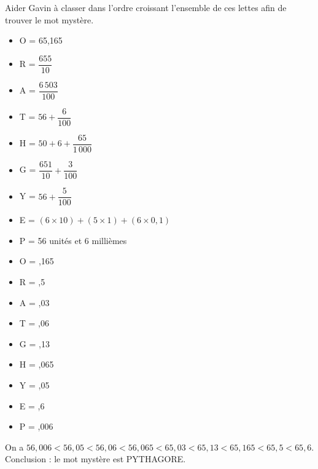 \begin{exercice} %
    Aider Gavin à classer dans l'ordre croissant l'ensemble de ces lettes afin de trouver le mot mystère. \smallskip
    \begin{itemize}
       \item O = 65,165 \medskip
       \item R = $\dfrac{655}{10}$ \medskip
       \item A = $\dfrac{6\,503}{100}$ \medskip
       \item T = $56+\dfrac{6}{100}$ \medskip
       \item H = $50+6+\dfrac{65}{1\,000}$ \medskip
       \item G = $\dfrac{651}{10}+\dfrac{3}{100}$ \medskip
       \item Y = $56+\dfrac{5}{100}$ \medskip
       \item E = $(6\times10)+(5\times1)+(6\times0,1)$ \smallskip
       \item P = 56 unités et 6 millièmes
    \end{itemize}

 \end{exercice}
 
 \begin{corrige}
    \begin{itemize}
       \item O = ,165
       \item R = ,5
       \item A = ,03
       \item T = ,06
       \item G = ,13
       \item H = ,065
       \item Y = ,05
       \item E = ,6
       \item P = ,006
    \end{itemize}
    On a {\blue $56,006 < 56,05 < 56,06 < 56,065 < 65,03 < 65,13 < 65,165 < 65,5 < 65,6$}. \\
    Conclusion : le mot mystère est \blue PYTHAGORE. \\
 \end{corrige}